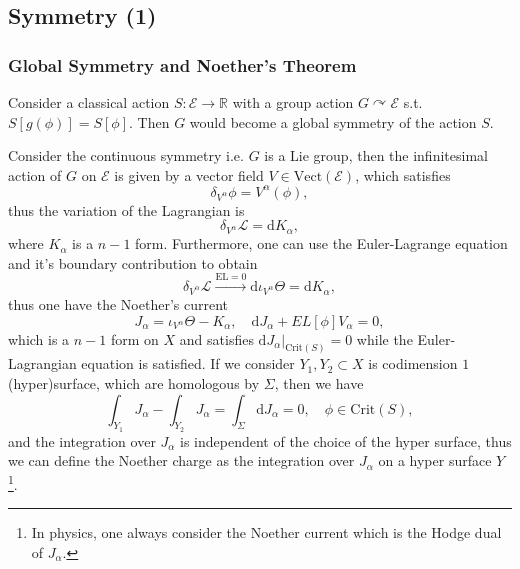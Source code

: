 \documentclass[10pt]{article}
\begin{document}
\subsection{Symmetry (1)}

\subsubsection{Global Symmetry and Noether's Theorem}

Consider a classical action $ S: \mathcal{E} \rightarrow \mathbb{R}$ with a group action $ G \curvearrowright \mathcal{E}$ s.t. $ S[g(\phi)] = S[\phi]$. Then $ G$ would become a global symmetry of the action $ S$.

Consider the continuous symmetry i.e. $ G$ is a Lie group, then the infinitesimal action of $ G$ on $ \mathcal{E}$ is given by a vector field $ V \in \mathrm{Vect}(\mathcal{E})$, which satisfies
\begin{equation*}
  \delta_{V^{\alpha}} \phi = V^{\alpha} (\phi),
\end{equation*}
thus the variation of the Lagrangian is
\begin{equation*}
  \delta_{V^{\alpha}} \mathcal{L} = \mathrm{d} K_{\alpha},
\end{equation*}
where $ K_{\alpha}$ is a $ n-1$ form. Furthermore, one can use the Euler-Lagrange equation and it's boundary contribution to obtain
\begin{equation*}
  \delta_{V^{\alpha}} \mathcal{L} \xrightarrow{\mathrm{EL} = 0} \mathrm{d} \iota_{V^{\alpha}} \Theta = \mathrm{d} K_{\alpha},
\end{equation*}
thus one have the Noether's current
\begin{equation}\label{eq:NoetherCurrent}
  J_{\alpha} = \iota_{V^{\alpha}}\Theta - K_{\alpha}, \quad \mathrm{d} J_{\alpha} + EL[\phi] V_{\alpha} = 0,
\end{equation}
which is a $ n-1$ form on $ X$ and satisfies $ \mathrm{d} J_{\alpha}\big|_{\mathrm{Crit}(S)} = 0$ while the Euler-Lagrangian equation is satisfied.
If we consider $ Y_1, Y_2 \subset X$ is codimension $ 1$ (hyper)surface, which are homologous by $ \Sigma$, then we have
\begin{equation*}
  \int _{Y_1} J_{\alpha} - \int _{Y_2} J_{\alpha} = \int _{\Sigma} \mathrm{d} J_{\alpha} = 0, \quad \phi \in \mathrm{Crit}(S),
\end{equation*}
and the integration over $ J_{\alpha}$ is independent of the choice of the hyper surface, thus we can define the Noether charge as the integration over $ J_{\alpha}$ on a hyper surface $ Y$
\footnote{In physics, one always consider the Noether current which is the Hodge dual of $J_{\alpha}$.}.
\end{document}
